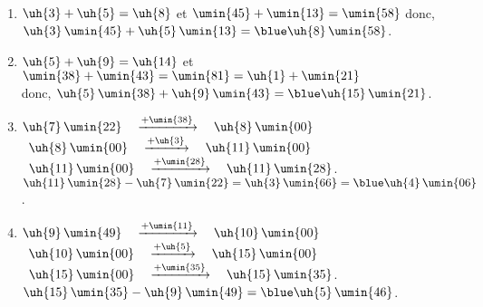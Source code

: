    \ \\ [-5mm]
   \begin{enumerate}
      \item $\uh{3}+\uh{5} =\uh{8}$ et $\umin{45}+\umin{13} =\umin{58}$ donc, $\uh{3}\,\umin{45}+\uh{5}\,\umin{13} =\blue \uh{8}\,\umin{58}$.
      \item $\uh{5}+\uh{9} =\uh{14}$ et \\
         $\umin{38}+\umin{43} =\umin{81} =\uh{1}+\umin{21}$ \\
         donc, $\uh{5}\,\umin{38}+\uh{9}\,\umin{43} =\blue \uh{15}\,\umin{21}$.
      \item $\uh{7}\,\umin{22} \quad \xrightarrow{+\umin{38}} \quad \uh{8}\,\umin{00}$ \\
         \quad\, $\uh{8}\,\umin{00} \quad \xrightarrow{+\uh{3}} \quad \uh{11}\,\umin{00}$ \\
         \quad\, $\uh{11}\,\umin{00}\quad \xrightarrow{+\umin{28}} \quad \uh{11}\,\umin{28}$. \\
         $\uh{11}\,\umin{28}-\uh{7}\,\umin{22} =\uh{3}\,\umin{66} =\blue \uh{4}\,\umin{06}$.
      \item $\uh{9}\,\umin{49} \quad \xrightarrow{+\umin{11}} \quad \uh{10}\,\umin{00}$ \\
         \quad\, $\uh{10}\,\umin{00} \quad \xrightarrow{+\uh{5}} \quad \uh{15}\,\umin{00}$ \\
         \quad\, $\uh{15}\,\umin{00}\quad \xrightarrow{+\umin{35}} \quad \uh{15}\,\umin{35}$. \\
         $\uh{15}\,\umin{35}-\uh{9}\,\umin{49} =\blue \uh{5}\,\umin{46}$.
   \end{enumerate}
